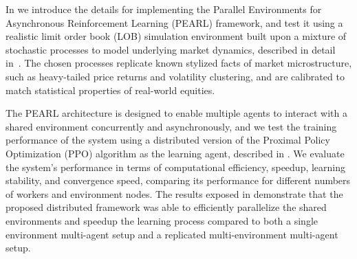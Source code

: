 In  we introduce the details for implementing the Parallel Environments for Asynchronous Reinforcement Learning (PEARL) framework,
and test it using a realistic limit order book (LOB) simulation environment built upon
a mixture of stochastic processes to model underlying market dynamics, described in detail in~.
The chosen processes replicate known stylized facts of market microstructure, such as heavy-tailed price returns and
volatility clustering, and are calibrated to match statistical properties of real-world equities.

The PEARL architecture is designed to enable multiple agents to interact with a shared environment concurrently and asynchronously,
and we test the training performance of the system using a distributed version of the Proximal Policy Optimization (PPO) algorithm
as the learning agent, described in .
We evaluate the system's performance in terms of computational efficiency, speedup, learning stability, and convergence speed,
comparing its performance for different numbers of workers and environment nodes.
The results exposed in  demonstrate that the proposed distributed framework
was able to efficiently parallelize the shared environments and speedup the learning process compared to both a single environment 
multi-agent setup and a replicated multi-environment multi-agent setup.
